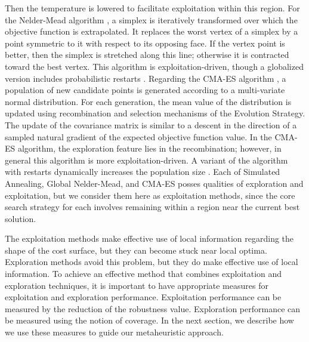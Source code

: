 Then the temperature is lowered to facilitate exploitation within this region. For the Nelder-Mead algorithm \cite{NelderMead65}, a simplex is iteratively transformed over which the objective function is extrapolated. It replaces the worst vertex of a simplex by a point symmetric to it with respect to its opposing face. If the vertex point is better, then the simplex is stretched along this line; otherwise it is contracted toward the best vertex. This algorithm is exploitation-driven, though a globalized version includes probabilistic restarts \cite{CHANG2012684}. Regarding the CMA-ES algorithm \cite{hansen2006eda}, a population of new candidate points is generated according to a multi-variate normal distribution. For each generation, the mean value of the distribution is updated using recombination and selection mechanisms of the Evolution Strategy. The update of the covariance matrix is similar to a descent in the direction of a sampled natural gradient of the expected objective function value. In the CMA-ES algorithm, the exploration feature lies in the recombination; however, in general this algorithm is more exploitation-driven. A variant of the algorithm with restarts dynamically increases the population size \cite{hansen2006eda}. Each of Simulated Annealing, Global Nelder-Mead, and CMA-ES posses qualities of exploration and exploitation, but we consider them here as exploitation methods, since the core search strategy for each involves remaining within a region near the current best solution.

The exploitation methods make effective use of local information regarding the shape of the cost surface, but they can become stuck near local optima. Exploration methods avoid this problem, but they do make effective use of local information. To achieve an effective method that combines exploitation and exploration techniques, it is important to have appropriate measures for exploitation and exploration performance. Exploitation performance can be measured by the reduction of the robustness value. Exploration performance can be measured using the notion of coverage. In the next section, we describe how we use these measures to guide our metaheuristic approach.
% 

